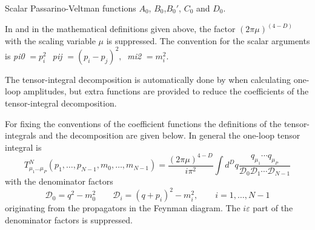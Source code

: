  {Scalar Passarino-Veltman functions $A_0$, $B_0$,$B_0'$, $C_0$ and $D_0$.}

In \fc and in the mathematical definitions given above,
the factor $(2\pi\mu)^{(4-D)}$ with the scaling variable $\mu$ is suppressed.
The convention for the scalar arguments is
{\sl pi0} $= p_i^2 \,\; \;${\sl pij} $= (p_i - p_j)^2, \; \; ${\sl mi2} $= m_i^2$.

\beom
{}
\enom

The tensor-integral decomposition is automatically done by
\fc when calculating one-loop amplitudes, 
but extra functions are provided to reduce the coefficients of the 
tensor-integral decomposition.

For fixing the conventions of the coefficient functions
the definitions of the tensor-integrals and the decomposition are given below.
In general the one-loop tensor integral is 
\[
T^{N}_{\mu_{1}\ldots\mu_{P}} (p_{1},\ldots,p_{N-1},m_{0},\ldots,m_{N-1})=
\frac{(2\pi\mu)^{4-D}}{i\pi^{2}}\int d^{D}\!q
\frac{q_{\mu _{1}}\cdots q_{\mu _{P}}}{
{\mathcal D}_{0}{\mathcal D}_{1}\cdots
{\mathcal D}_{N-1}
}
\]
with the denominator factors
\[
{\mathcal D}_{0}=
q^{2}-m_{0}^{2} \nonumber \qquad 
{\mathcal D}_{i}=
(q+p_{i})^{2}-m_{i}^{2}, \nonumber \qquad i=1,\ldots,N-1 \nonumber
\]
originating from the propagators in the Feynman diagram.
The $i \varepsilon $ part of the denominator factors is suppressed.

